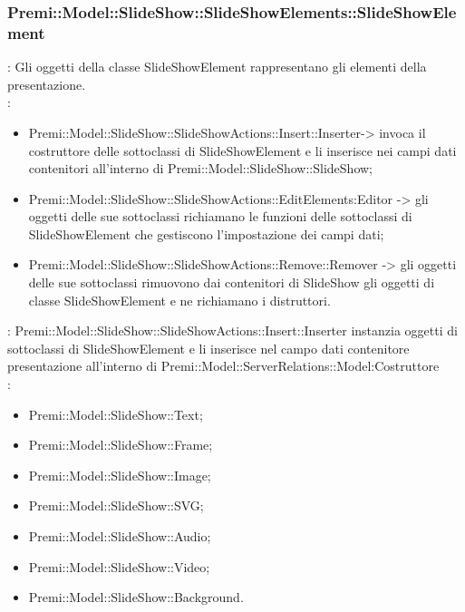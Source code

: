 {    \subsubsection{Premi::Model::SlideShow::SlideShowElements::SlideShowElement}{
				\textbf{\tipo}: Gli oggetti della classe SlideShowElement rappresentano gli elementi della presentazione.\\	
				\textbf{\relaz}: 
				\begin{itemize}
					\item Premi::Model::SlideShow::SlideShowActions::Insert::Inserter-> invoca il costruttore delle sottoclassi di SlideShowElement e li inserisce nei campi dati contenitori all’interno di Premi::Model::SlideShow::SlideShow;
                    \item Premi::Model::SlideShow::SlideShowActions::EditElements:Editor -> gli oggetti delle sue sottoclassi richiamano le funzioni delle sottoclassi di SlideShowElement che gestiscono l’impostazione dei campi dati;
                    \item Premi::Model::SlideShow::SlideShowActions::Remove::Remover -> gli oggetti delle sue sottoclassi rimuovono dai contenitori di SlideShow gli oggetti di classe SlideShowElement e ne richiamano i distruttori.
				\end{itemize}	
                \textbf{\interfacce}: Premi::Model::SlideShow::SlideShowActions::Insert::Inserter instanzia oggetti di sottoclassi di SlideShowElement e li inserisce nel campo dati contenitore presentazione all’interno di Premi::Model::ServerRelations::Model:Costruttore\\
                \textbf{\figli}: 
                    \begin{itemize}
                    \item Premi::Model::SlideShow::Text;
                    \item Premi::Model::SlideShow::Frame;
                    \item Premi::Model::SlideShow::Image;
                    \item Premi::Model::SlideShow::SVG;
                    \item Premi::Model::SlideShow::Audio;
                    \item Premi::Model::SlideShow::Video;
                    \item Premi::Model::SlideShow::Background.
                    \end{itemize}
                    }
}
